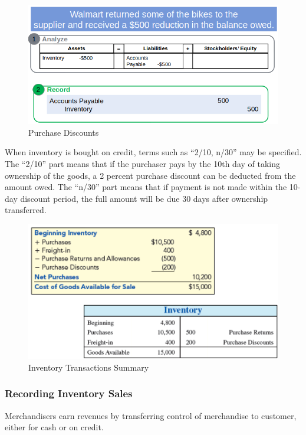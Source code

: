 \documentclass[../main.tex]{subfiles}
\begin{document}
	\begin{figure}[ht!]
		\centering
		\includegraphics[width=1\columnwidth]{images/c7/purcahse_returns_allowances_eg.png}
		\caption{Purchase Discounts}
	\end{figure}
	
	When inventory is bought on credit, terms such as “2/10, n/30” may be 
	specified. The “2/10” part means that if the purchaser pays by the 10th day 
	of taking ownership of the goods, a 2 percent purchase discount can be 
	deducted from the amount owed. The “n/30” part means that if payment is not 
	made within the 10-day discount period, the full amount will be due 30 days 
	after ownership transferred.
	
		
	\begin{figure}[ht!]
		\centering
		\includegraphics[width=1\columnwidth]{images/c7/inventory_transactions_summary.png}
		\caption{Inventory Transactions Summary}
	\end{figure}
	
	\subsubsection{Recording Inventory Sales}
	
	Merchandisers earn revenues by transferring control of merchandise to 
	customer, either for cash or on credit. 
	
\end{document}
